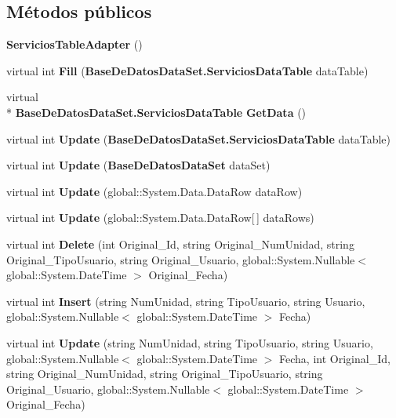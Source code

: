 \subsection*{Métodos públicos}
\begin{DoxyCompactItemize}
\item 
{\bf Servicios\-Table\-Adapter} ()
\item 
virtual int {\bf Fill} ({\bf Base\-De\-Datos\-Data\-Set.\-Servicios\-Data\-Table} data\-Table)
\item 
virtual \\*
{\bf Base\-De\-Datos\-Data\-Set.\-Servicios\-Data\-Table} {\bf Get\-Data} ()
\item 
virtual int {\bf Update} ({\bf Base\-De\-Datos\-Data\-Set.\-Servicios\-Data\-Table} data\-Table)
\item 
virtual int {\bf Update} ({\bf Base\-De\-Datos\-Data\-Set} data\-Set)
\item 
virtual int {\bf Update} (global\-::\-System.\-Data.\-Data\-Row data\-Row)
\item 
virtual int {\bf Update} (global\-::\-System.\-Data.\-Data\-Row[$\,$] data\-Rows)
\item 
virtual int {\bf Delete} (int Original\-\_\-\-Id, string Original\-\_\-\-Num\-Unidad, string Original\-\_\-\-Tipo\-Usuario, string Original\-\_\-\-Usuario, global\-::\-System.\-Nullable$<$ global\-::\-System.\-Date\-Time $>$ Original\-\_\-\-Fecha)
\item 
virtual int {\bf Insert} (string Num\-Unidad, string Tipo\-Usuario, string Usuario, global\-::\-System.\-Nullable$<$ global\-::\-System.\-Date\-Time $>$ Fecha)
\item 
virtual int {\bf Update} (string Num\-Unidad, string Tipo\-Usuario, string Usuario, global\-::\-System.\-Nullable$<$ global\-::\-System.\-Date\-Time $>$ Fecha, int Original\-\_\-\-Id, string Original\-\_\-\-Num\-Unidad, string Original\-\_\-\-Tipo\-Usuario, string Original\-\_\-\-Usuario, global\-::\-System.\-Nullable$<$ global\-::\-System.\-Date\-Time $>$ Original\-\_\-\-Fecha)
\end{DoxyCompactItemize}
